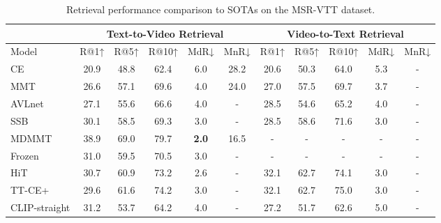 \documentclass[sigconf]{acmart}
\begin{document}
\begin{table}[]
\caption{Retrieval performance comparison to SOTAs on the MSR-VTT dataset.}
\vspace{-0.3cm}
\begin{tabular}{l|ccccc|ccccc}
\hline
           & \multicolumn{5}{c|}{Text-to-Video Retrieval}                                  & \multicolumn{5}{c}{Video-to-Text Retrieval}                                  \\
           \hline
Model      & R@1↑          & R@5↑          & R@10↑         & MdR↓         & MnR↓          & R@1↑          & R@5↑          & R@10↑
& MdR↓         & MnR↓          \\ \hline
CE \cite{liu2019use}        & 20.9          & 48.8          & 62.4          & 6.0          & 28.2          & 20.6          & 50.3          & 64.0          & 5.3          & -             \\
MMT  \cite{gabeur2020multi}      & 26.6          & 57.1          & 69.6          & 4.0          & 24.0          & 27.0          & 57.5          & 69.7          & 3.7          & -             \\
AVLnet \cite{rouditchenko2020avlnet}    & 27.1          & 55.6          & 66.6          & 4.0          & -             & 28.5          & 54.6          & 65.2          & 4.0          & -             \\
SSB \cite{patrick2020support}       & 30.1          & 58.5          & 69.3          & 3.0          & -             & 28.5          & 58.6          & 71.6          & 3.0          & -             \\
MDMMT \cite{dzabraev2021mdmmt}     & 38.9          & 69.0          & 79.7          & \textbf{2.0}          & 16.5          & -             & -             & -             & -            & -             \\
Frozen \cite{bain2021frozen}    & 31.0          & 59.5          & 70.5          & 3.0          & -             & -             & -             & -             & -            & -             \\
HiT  \cite{liu2021hit}      & 30.7          & 60.9          & 73.2          & 2.6          & -             & 32.1          & 62.7          & 74.1          & 3.0          & -             \\
TT-CE+  \cite{croitoru2021teachtext}   & 29.6          & 61.6          & 74.2          & 3.0          & -             & 32.1          & 62.7          & 75.0          & 3.0          & -             \\
CLIP-straight  \cite{portillo2021straightforward}     & 31.2          & 53.7          & 64.2          & 4.0          & -             & 27.2          & 51.7          & 62.6          & 5.0          & -             \\

\end{tabular}
\end{table}
\end{document}
